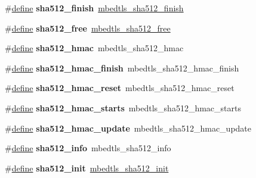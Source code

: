 \begin{DoxyCompactItemize}
\mbox{\label{compat-1_83_8h_a48786ccccff3cd93be02cbce18472cb2}} 
\#\hyperlink{structdefine}{define} {\bfseries sha512\+\_\+finish}~\hyperlink{sha512_8h_aa15b18fc57976f9f4bb4b9f8c34d481d}{mbedtls\+\_\+sha512\+\_\+finish}
\item 
\mbox{\label{compat-1_83_8h_a9c6d4297dc245db4983fb058d0aa62f5}} 
\#\hyperlink{structdefine}{define} {\bfseries sha512\+\_\+free}~\hyperlink{sha512_8h_a63c673fa54cb703372fef5df4db02d28}{mbedtls\+\_\+sha512\+\_\+free}
\item 
\mbox{\label{compat-1_83_8h_a556cfe1a60cab6a1da90dc918e49dd67}} 
\#\hyperlink{structdefine}{define} {\bfseries sha512\+\_\+hmac}~mbedtls\+\_\+sha512\+\_\+hmac
\item 
\mbox{\label{compat-1_83_8h_affe83f3e7de3d6d790650f0e801a6b0f}} 
\#\hyperlink{structdefine}{define} {\bfseries sha512\+\_\+hmac\+\_\+finish}~mbedtls\+\_\+sha512\+\_\+hmac\+\_\+finish
\item 
\mbox{\label{compat-1_83_8h_a66205ab64abcb3b7212cb6a27b54e0a1}} 
\#\hyperlink{structdefine}{define} {\bfseries sha512\+\_\+hmac\+\_\+reset}~mbedtls\+\_\+sha512\+\_\+hmac\+\_\+reset
\item 
\mbox{\label{compat-1_83_8h_a7252ee5e821bd1c5d0d130aa5a5e292c}} 
\#\hyperlink{structdefine}{define} {\bfseries sha512\+\_\+hmac\+\_\+starts}~mbedtls\+\_\+sha512\+\_\+hmac\+\_\+starts
\item 
\mbox{\label{compat-1_83_8h_aff0efe175b24e2bccfa000a3ba985381}} 
\#\hyperlink{structdefine}{define} {\bfseries sha512\+\_\+hmac\+\_\+update}~mbedtls\+\_\+sha512\+\_\+hmac\+\_\+update
\item 
\mbox{\label{compat-1_83_8h_a5f4b8f3b04291d003d34c42d9214697b}} 
\#\hyperlink{structdefine}{define} {\bfseries sha512\+\_\+info}~mbedtls\+\_\+sha512\+\_\+info
\item 
\mbox{\label{compat-1_83_8h_a3093af54d147b1225538962f06d73cb1}} 
\#\hyperlink{structdefine}{define} {\bfseries sha512\+\_\+init}~\hyperlink{sha512_8h_afefd852a76626e45968b79b70642f3bc}{mbedtls\+\_\+sha512\+\_\+init}

\end{DoxyCompactItemize}
